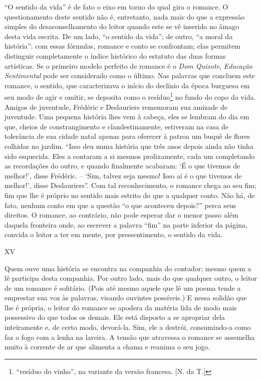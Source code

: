 ``O sentido da vida'' é de fato o eixo em torno do qual gira o romance.
O questionamento deste sentido não é, entretanto, nada mais do que a
expressão simples do desaconselhamento do leitor quando este se vê
inserido no âmago desta vida escrita. De um lado, ``o sentido da vida'';
de outro, ``a moral da história'': com essas fórmulas, romance e conto
se confrontam; elas permitem distinguir completamente o índice histórico
do estatuto das duas formas artísticas. Se o primeiro modelo perfeito de
romance é o \emph{Dom Quixote}, \emph{Educação Sentimental} pode ser
considerado como o último. Nas palavras que concluem este romance, o
sentido, que caracterizava o início do declínio da época burguesa em seu
modo de agir e omitir, se deposita como o resíduo\footnote{``resíduo do
  vinho'', na variante da versão francesa. {[}N. da T.{]}} no fundo do
copo da vida. Amigos de juventude, Frédéric e Deslauriers rememoram sua
amizade de juventude. Uma pequena história lhes vem à cabeça, eles se
lembram do dia em que, cheios de constrangimento e clandestinamente,
estiveram na casa de tolerância de sua cidade natal apenas para oferecer
à patroa um buquê de flores colhidas no jardim. ``Isso deu numa história
que três anos depois ainda não tinha sido esquecida. Eles a contaram a
si mesmos prolixamente, cada um completando as recordações do outro, e
quando finalmente acabaram: `É o que tivemos de melhor!', disse
Frédéric. -- `Sim, talvez seja mesmo! Isso aí é o que tivemos de
melhor!', disse Deslauriers''. Com tal reconhecimento, o romance chega
ao seu fim; fim que lhe é próprio no sentido mais estrito do que a
qualquer conto. Não há, de fato, nenhum conto em que a questão ``o que
aconteceu depois?'' perca seus direitos. O romance, ao contrário, não
pode esperar dar o menor passo além daquela fronteira onde, ao escrever
a palavra ``fim'' na parte inferior da página, convida o leitor a ter em
mente, por pressentimento, o sentido da vida.

XV

Quem ouve uma história se encontra na companhia do contador; mesmo quem
a lê participa desta companhia. Por outro lado, mais do que qualquer
outro, o leitor de um romance é solitário. (Pois até mesmo aquele que lê
um poema tende a emprestar sua voz às palavras, visando ouvintes
possíveis.) E nessa solidão que lhe é própria, o leitor do romance se
apodera da matéria lida de modo mais possessivo do que todos os demais.
Ele está disposto a se apropriar dela inteiramente e, de certo modo,
devorá-la. Sim, ele a destrói, consumindo-a como faz o fogo com a lenha
na lareira. A tensão que atravessa o romance se assemelha muito à
corrente de ar que alimenta a chama e reanima o seu jogo.

